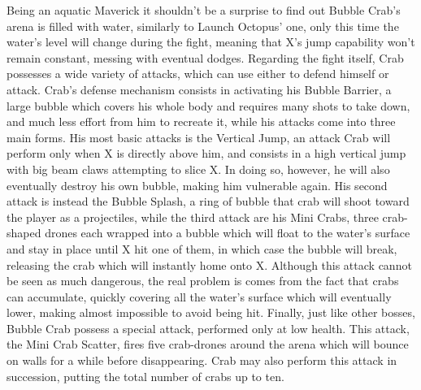 Being an aquatic Maverick it shouldn't be a surprise to find out Bubble Crab's arena is filled with water, similarly to Launch Octopus' one, only this time the water's level will change during the fight, meaning that X's jump capability won't remain constant, messing with eventual dodges. Regarding the fight itself, Crab possesses a wide variety of attacks, which can use either to defend himself or attack. Crab's defense mechanism consists in activating his Bubble Barrier, a large bubble which covers his whole body and requires many shots to take down, and much less effort from him to recreate it, while his attacks come into three main forms. His most basic attacks is the Vertical Jump, an attack Crab will perform only when X is directly above him, and consists in a high vertical jump with big beam claws attempting to slice X. In doing so, however, he will also eventually destroy his own bubble, making him vulnerable again. His second attack is instead the Bubble Splash, a ring of bubble that crab will shoot toward the player as a projectiles, while the third attack are his Mini Crabs,  three crab-shaped drones each wrapped into a bubble which will float to the water's surface and stay in place until X hit one of them, in which case the bubble will break, releasing the crab which will instantly home onto X. Although this attack cannot be seen as much dangerous, the real problem is comes from the fact that crabs can accumulate, quickly covering all the water's surface which will eventually lower, making almost impossible to avoid being hit. Finally, just like other bosses, Bubble Crab possess a special attack, performed only at low health. This attack, the Mini Crab Scatter, fires five crab-drones around the arena which will bounce on walls for a while before disappearing. Crab may also perform this attack in succession, putting the total number of crabs up to ten.

